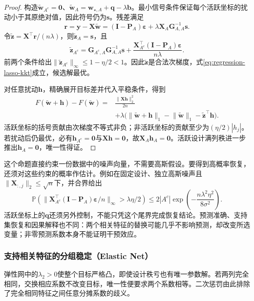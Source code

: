 \begin{proof}
构造$\widetilde{\bm{w}}_{A^c}=\bm{0}$、$\widetilde{\bm{w}}_A=\bm{w}_{\star,A}+\bm{q}-\lambda\bm{b}$。最小信号条件保证每个活跃坐标的扰动小于其原绝对值，因此符号仍为$\bm{s}$。残差满足
\[
  \bm{r}=\bm{y}-\bm{X}\widetilde{\bm{w}}
  =(\bm{I}-\bm{P}_A)\bm{\varepsilon}
   +\lambda\bm{X}_A\bm{G}_{A,A}^{-1}\bm{s}.
\]
令$\widetilde{\bm{z}}=\bm{X}^{\top}\bm{r}/(n\lambda)$，则$\widetilde{\bm{z}}_A=\bm{s}$，且
\[
  \widetilde{\bm{z}}_{A^c}
  =\bm{G}_{A^c,A}\bm{G}_{A,A}^{-1}\bm{s}
    +\frac{\bm{X}_{A^c}^{\top}(\bm{I}-\bm{P}_A)
            \bm{\varepsilon}}{n\lambda}.
\]
前两个条件给出$\lVert\widetilde{\bm{z}}_{A^c}\rVert_\infty\leq1-\eta/2<1$。因此$\widetilde{\bm{z}}$是合法次梯度，式\eqref{eq:regression-lasso-kkt}成立，候选解最优。

对任意扰动$\bm{h}$，精确展开目标差并代入平稳条件，得到
\[
  \begin{aligned}
    F(\widetilde{\bm{w}}+\bm{h})-F(\widetilde{\bm{w}})
    ={}&\frac{\lVert\bm{X}\bm{h}\rVert_2^2}{2n}\\
      &+\lambda\bigl(\lVert\widetilde{\bm{w}}+\bm{h}\rVert_1
         -\lVert\widetilde{\bm{w}}\rVert_1
         -\widetilde{\bm{z}}^{\top}\bm{h}\bigr).
  \end{aligned}
\]
活跃坐标的括号贡献由次梯度不等式非负；非活跃坐标的贡献至少为$(\eta/2)|h_j|$。若扰动后仍最优，必有$\bm{h}_{A^c}=\bm{0}$与$\bm{X}\bm{h}=\bm{0}$，故$\bm{X}_A\bm{h}_A=\bm{0}$。活跃设计满列秩进一步推出$\bm{h}_A=\bm{0}$，唯一性得证。
\end{proof}

这个命题直接约束一份数据中的噪声向量，不需要高斯假设。要得到高概率恢复，还须对这些约束的概率作估计。例如在固定设计、独立高斯噪声且$\lVert\bm{X}_{:,j}\rVert_2\leq\sqrt n$下，并合界给出
\[
  \mathbb{P}\!\left(
    \lVert\bm{X}_{A^c}^{\top}(\bm{I}-\bm{P}_A)
       \bm{\varepsilon}/n\rVert_\infty>\lambda\eta/2
  \right)
  \leq2|A^c|\exp\!\left(-\frac{n\lambda^2\eta^2}{8\sigma^2}\right).
\]
活跃坐标上的$\bm{q}$还须另外控制，不能只凭这个尾界完成恢复结论。预测准确、支持集恢复和因果解释也不同：两个相关特征的替换可能几乎不影响预测，却改变所选变量；非零预测系数本身不能证明干预效应。

\subsubsection{支持相关特征的分组稳定（Elastic Net）}
\label{sec:regression-elastic-net}

弹性网中的$\lambda_2>0$使整个目标严格凸，即使设计秩亏也有唯一参数解。若两列完全相同，交换相应系数不改变目标，唯一性便要求两个系数相等。二次惩罚由此排除了完全相同特征之间任意分摊系数的歧义。

